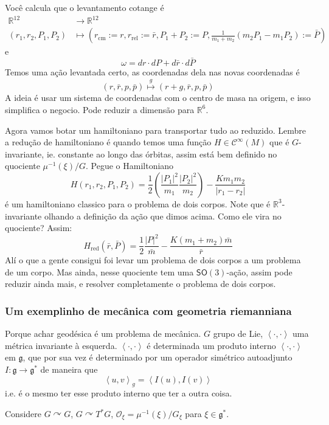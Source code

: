 Você calcula que o levantamento cotange é
\begin{align*}
	\mathbb{R}^{12} &\longrightarrow \mathbb{R}^{12} \\
	(r_1,r_2,P_1,P_2) &\longmapsto \left( r_{\operatorname{cm}}:=r,r_{\operatorname{rel}}:=\bar{r},P_1+P_2:=P,\frac{1}{m_1+m_2}(m_2P_1-m_1P_2):=\bar{P} \right) 
\end{align*}
e
\[\omega=dr\cdot dP+d\bar{r}\cdot d\bar{P}\]
Temos uma ação levantada certo, as coordenadas dela nas novas coordenadas é
\[(r,\bar{r},p,\bar{p})\overset{g}{\longmapsto}(r+g,\bar{r},p,\bar{p})\]
A ideia é usar um sistema de coordenadas com o centro de masa na origem, e isso simplifica o negocio. Pode reduzir a dimensão para $\mathbb{R}^{6}$.

Agora vamos botar um hamiltoniano para transportar tudo ao reduzido. Lembre a redução de hamiltoniano é quando temos uma função $H\in\mathcal{C}^\infty(M)$ que é $G$-invariante, ie. constante ao longo das órbitas, assim está bem definido no quociente $\mu^{-1}(\xi)/G$. Pegue o Hamiltoniano
\[H(r_1,r_2,P_1,P_2)=\frac{1}{2}\left( \frac{|P_1|^2}{m_1}\frac{|P_2|^2}{m_2} \right) -\frac{Km_1m_2}{|r_1-r_2|}\]
é um hamiltoniano classico para o problema de dois corpos. Note que é $\mathbb{R}^{3}$-invariante olhando a definição da ação que dimos acima. Como ele vira no quociente? Assim:
\[H_{\operatorname{red}}(\bar{r},\bar{P})=\frac{1}{2}\frac{|P|^2}{\bar{m}}-\frac{K(m_1+m_2)\bar{m} }{\bar{r}}\]
Alí o que a gente consigui foi levar um problema de dois corpos a um problema de um corpo. Mas ainda, nesse quociente tem uma $\mathsf{SO}(3)$-ação, assim pode reduzir ainda mais, e resolver completamente o problema de dois corpos.

\subsubsection{Um exemplinho de mecânica com geometria riemanniana}

Porque achar geodésica é um problema de mecânica. $G$ grupo de Lie, $\left<\cdot,\cdot\right> $ uma métrica invariante à esquerda. $\left<\cdot,\cdot\right> $ é determinada um produto interno $\left<\cdot,\cdot\right> $ em $\mathfrak{g}$, que por sua vez é determinado por um operador simétrico autoadjunto $I:\mathfrak{g} \longrightarrow \mathfrak{g}^*$ de maneira que
\[\left<u,v\right>_{g}=\left<I(u),I(v)\right> \]
i.e. é o mesmo ter esse produto interno que ter a outra coisa.

Considere $G\curvearrowright G$, $G\curvearrowright T^*G$, $\mathcal{O}_\xi=\mu^{-1}(\xi)/G_\xi$ para $\xi \in\mathfrak{g}^*$.

